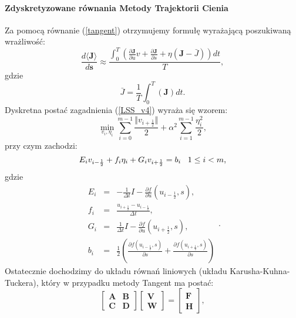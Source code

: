 \documentclass[12pt]{article}
\begin{document}
\paragraph{Zdyskretyzowane równania Metody Trajektorii Cienia}
Za pomocą równanie (\ref{tangent}) otrzymujemy formułę wyrażającą poszukiwaną wrażliwość:
\begin{equation}
\frac{d\langle\textbf{J}\rangle}{d\textbf{s}} \approx \frac{\int_{0}^{T}(\frac{\partial \textbf{J}}{\partial u}v+\frac{\partial \textbf{J}}{\partial s}+\eta(\textbf{J}-\bar{J}))dt}{T}, 
\label{LSS_v5}
\end{equation}
gdzie
\begin{equation}
\bar{J} = \frac{1}{T}\int_{0}^{T}(\textbf{J})dt.
\label{LSS_v6}
\end{equation}
Dyskretna postać zagadnienia (\ref{LSS_v4}) wyraża się wzorem:
\begin{equation}
\min_{v_{i},\eta_{i}}\sum_{i=0}^{m-1}\frac{\Vert v_{i+\frac{1}{2}}\Vert}{2} + \alpha^{2}\sum_{i=1}^{m-1}\frac{\eta^{2}_{i}}{2} ,
\label{LSS_v7}
\end{equation}
przy czym zachodzi:
\begin{equation}
E_{i}v_{i-\frac{1}{2}}+f_{i}\eta_{i}+G_{i}v_{i+\frac{1}{2}} = b_{i} \thickspace \thickspace \thickspace 1\leq i < m,
\label{LSS_v8}
\end{equation}
gdzie
\begin{equation}
\begin{array}{rcl}
E_{i} &=& -\frac{1}{\Delta t}I-\frac{\partial{f}}{\partial{u}}(u_{i-\frac{1}{2}},s), \\
f_{i} &=& \frac{u_{i+\frac{1}{2}}-u_{i-\frac{1}{2}}}{\Delta t}, \\
G_{i} &=& \frac{1}{\Delta t}I-\frac{\partial{f}}{\partial{u}}(u_{i+\frac{1}{2}},s), \\ 
b_{i} &=& \frac{1}{2}(\frac{\partial{f}(u_{i-\frac{1}{2}},s)}{\partial{s}}+\frac{\partial{f}(u_{i+\frac{1}{2}},s)}{\partial{s}}) 
\end{array}.
\label{LSS_v9}
\end{equation}
Ostatecznie dochodzimy do układu równań liniowych (układu Karusha-Kuhna-Tuckera), który w przypadku metody Tangent ma postać:
\begin{equation}
\begin{bmatrix}
\textbf{A} & \textbf{B} \\
\textbf{C} & \textbf{D} 
\end{bmatrix}
\begin{bmatrix}
\textbf{V} \\
\textbf{W} 
\end{bmatrix}
= \begin{bmatrix}
\textbf{F} \\
\textbf{H} 
\end{bmatrix},
\label{LSS_v10}
\end{equation}
\end{document}
